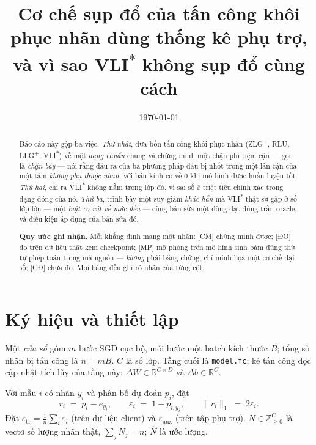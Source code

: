 \documentclass[11pt,a4paper]{article}
\title{Cơ chế sụp đổ của tấn công khôi phục nhãn dùng thống kê phụ trợ,\\[0.35em]
và vì sao VLI\textsuperscript{$*$} không sụp đổ cùng cách}
\author{}
\date{\today}
\theoremstyle{remark}
\newcommand{\epstr}{\bar\varepsilon_{\mathrm{tr}}}
\newcommand{\epsaux}{\bar\varepsilon_{\mathrm{aux}}}
\newcommand{\code}[1]{\texttt{\small #1}}
\newcommand{\CM}{\textsf{[CM]}}
\newcommand{\DO}{\textsf{[ĐO]}}
\newcommand{\MP}{\textsf{[MP]}}
\newcommand{\CD}{\textsf{[CĐ]}}
\begin{document}
\maketitle

\begin{abstract}
\noindent
Báo cáo này gộp ba việc. \emph{Thứ nhất}, đưa bốn tấn công khôi phục nhãn
(ZLG\textsuperscript{+}, RLU, LLG\textsuperscript{+}, VLI\textsuperscript{$*$})
về một \emph{dạng chuẩn} chung và chứng minh một chặn phi tiệm cận --- gọi là
\emph{chặn bẫy} --- nói rằng đầu ra của ba phương pháp đầu bị nhốt trong một
lân cận của một tâm \emph{không phụ thuộc nhãn}, với bán kính co về 0 khi mô
hình được huấn luyện tốt. \emph{Thứ hai}, chỉ ra VLI\textsuperscript{$*$} không
nằm trong lớp đó, vì sai số $\bar\varepsilon$ triệt tiêu chính xác trong dạng
đóng của nó. \emph{Thứ ba}, trình bày một suy giảm \emph{khác hẳn} mà
VLI\textsuperscript{$*$} thật sự gặp ở số lớp lớn --- một \emph{luật co rút về
mức đều} --- cùng bản sửa một dòng đạt đúng trần oracle, và điều kiện áp dụng
của bản sửa đó.

\medskip\noindent
\textbf{Quy ước ghi nhận.} Mỗi khẳng định mang một nhãn: \CM{} chứng minh được;
\DO{} đo trên dữ liệu thật kèm checkpoint; \MP{} mô phỏng trên mô hình sinh bám
đúng thứ tự phép toán trong mã nguồn --- \emph{không} phải bằng chứng, chỉ minh
họa một cơ chế đại số; \CD{} chưa đo. Mọi bảng đều ghi rõ nhãn của từng cột.
\end{abstract}

\tableofcontents
\medskip

\section{Ký hiệu và thiết lập}

Một \emph{cửa sổ} gồm $m$ bước SGD cục bộ, mỗi bước một batch kích thước $B$;
tổng số nhãn bị tấn công là $n=mB$. $C$ là số lớp. Tầng cuối là
\code{model.fc}; kẻ tấn công đọc cập nhật tích lũy của tầng này:
$\Delta W\in\mathbb{R}^{C\times D}$ và $\Delta b\in\mathbb{R}^{C}$.

Với mẫu $i$ có nhãn $y_i$ và phân bố dự đoán $p_i$, đặt
\[
  r_i \;=\; p_i-e_{y_i},\qquad
  \varepsilon_i \;=\; 1-p_{i,y_i},\qquad
  \|r_i\|_1 \;=\; 2\varepsilon_i .
\]
Đặt $\epstr=\frac1n\sum_{i}\varepsilon_i$ (trên dữ liệu client) và $\epsaux$
(trên tập phụ trợ). $N\in\mathbb{Z}_{\ge0}^C$ là vectơ số lượng nhãn thật,
$\sum_j N_j=n$; $\hat N$ là ước lượng.
\end{document}
